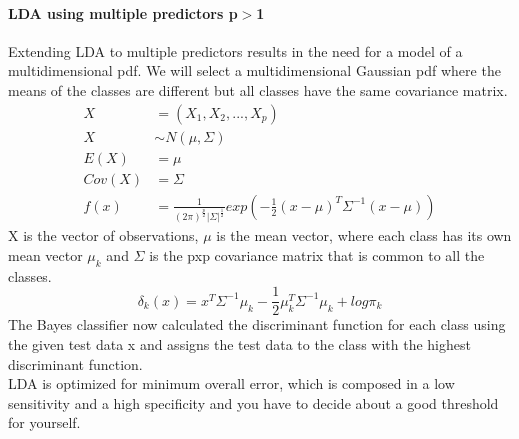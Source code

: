 \documentclass[../document.tex]{subfiles}
\begin{document}
	\paragraph{LDA using multiple predictors p\(>\)1}
	Extending LDA to multiple predictors results in the need for a model of a multidimensional pdf. We will select a multidimensional Gaussian pdf where the means of the classes are different but all classes have the same covariance matrix.
	\begin{equation}
	\begin{split}
		X&=(X_{1},X_{2},...,X_{p})\\
		X&\sim N(\mu,\Sigma)\\
		E(X)&=\mu\\
		Cov(X)&=\Sigma\\
		f(x)&=\frac{1}{(2\pi)^\frac{p}{2}|\Sigma|^\frac{1}{2}}exp(-\frac{1}{2}(x-\mu)^T\Sigma^{-1}(x-\mu))
	\end{split}
	\end{equation}
	X is the vector of observations, \(\mu\) is the mean vector, where each class has its own mean vector \(\mu_{k}\) and \(\Sigma\) is the pxp covariance matrix that is common to all the classes.
	\begin{equation}
		\delta_{k}(x)=x^T\Sigma^{-1}\mu_{k}-\frac{1}{2}\mu_{k}^T\Sigma^{-1}\mu_{k}+log\pi_{k}
	\end{equation}
	The Bayes classifier now calculated the discriminant function for each class using the given test data x and assigns the test data to the class with the highest discriminant function.\\
	LDA is optimized for minimum overall error, which is composed in a low sensitivity and a high specificity and you have to decide about a good threshold for yourself.
\end{document}

